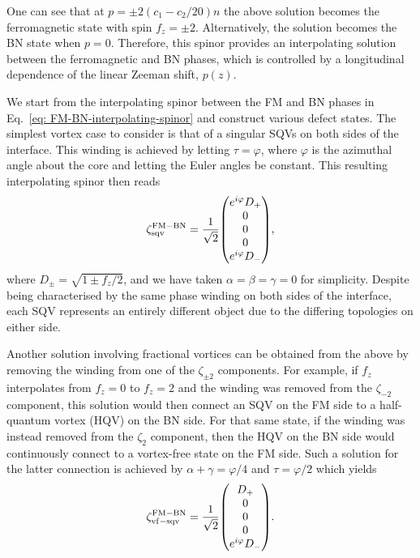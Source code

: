 One can see that at \(p = \pm 2(c_1-c_2/20)n\) the above solution becomes
the ferromagnetic state with spin \(f_z = \pm 2\).
Alternatively, the solution becomes the BN state when \(p=0\).
Therefore, this spinor provides an interpolating solution between the
ferromagnetic and BN phases, which is controlled by a longitudinal dependence of
the linear Zeeman shift, \(p(z)\).

We start from the interpolating spinor between the FM and BN phases in
Eq.~\eqref{eq: FM-BN-interpolating-spinor} and construct various defect states.
The simplest vortex case to consider is that of a singular SQVs on both sides of
the interface.
This winding is achieved by letting \(\tau = \varphi \), where \(\varphi \) is
the azimuthal angle about the core and letting the Euler angles be constant.
This resulting interpolating spinor then reads
\begin{equation}
    \zeta^\mathrm{FM-BN}_\mathrm{sqv} =
    \frac{1}{\sqrt{2}}\mqty(e^{i\varphi}D_+ \\ 0 \\ 0 \\ 0 \\
    e^{i\varphi}D_-),
\end{equation}
where \(D_\pm = \sqrt{1 \pm f_z / 2}\), and we have taken
\(\alpha=\beta=\gamma=0\) for simplicity.
Despite being characterised by the same phase winding on both sides of the
interface, each SQV represents an entirely different object due to the
differing topologies on either side.

Another solution involving fractional vortices can be obtained from the
above by removing the winding from one of the \(\zeta_{\pm 2}\) components.
For example, if \(f_z\) interpolates from \(f_z=0\) to \(f_z=2\) and the winding
was removed from the \(\zeta_{-2}\) component, this solution would then connect
an SQV on the FM side to a half-quantum vortex (HQV) on the BN side.
For that same state, if the winding was instead removed from the \(\zeta_{2}\)
component, then the HQV on the BN side would continuously connect to a
vortex-free state on the FM side.
Such a solution for the latter connection is achieved by
\(\alpha + \gamma = \varphi / 4\) and \(\tau=\varphi / 2\) which yields
\begin{equation}
    \zeta^\mathrm{FM-BN}_\mathrm{vf-sqv} =
    \frac{1}{\sqrt{2}}\mqty(D_+ \\ 0 \\ 0 \\ 0 \\
    e^{i\varphi}D_-).
\end{equation}

